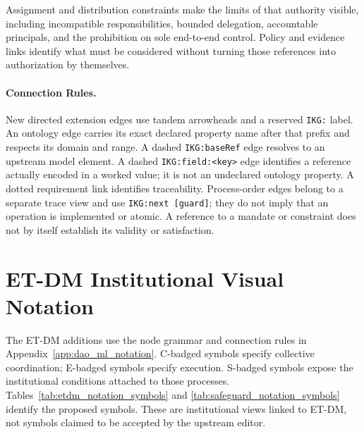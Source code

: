 \documentclass[journal]{IEEEtran}
\begin{document}
Assignment and distribution constraints make the limits of that authority
visible, including incompatible responsibilities, bounded delegation,
accountable principals, and the prohibition on sole end-to-end control.
Policy and evidence links identify what must be considered without
turning those references into authorization by themselves.

\paragraph{Connection Rules.}
New directed extension edges use tandem arrowheads and a
reserved \texttt{IKG:} label. An ontology edge carries its exact
declared property name after that prefix and respects its
domain and range. A dashed
\texttt{IKG:baseRef} edge resolves to an upstream model element.
A dashed \texttt{IKG:field:<key>} edge identifies a reference
actually encoded in a worked value; it is not an undeclared
ontology property. A dotted requirement link identifies
traceability. Process-order edges belong to a separate trace
view and use \texttt{IKG:next [guard]}; they do not imply that an
operation is implemented or atomic. A reference to a mandate
or constraint does not by itself establish its validity or
satisfaction.

\section{ET-DM Institutional Visual Notation}
\label{app:etdm_notation}

The ET-DM additions use the node grammar and connection rules
in Appendix~\ref{app:dao_ml_notation}. C-badged symbols specify
collective coordination; E-badged symbols specify execution.
S-badged symbols expose the institutional conditions attached
to those processes. Tables~\ref{tab:etdm_notation_symbols} and
\ref{tab:safeguard_notation_symbols} identify the proposed
symbols. These are institutional views linked to ET-DM,
not symbols claimed to be accepted by the upstream editor.
\end{document}
